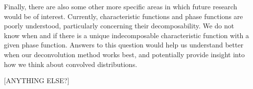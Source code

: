 Finally, there are also some other more specific areas in which future research would be of interest. Currently, characteristic functions and phase functions are poorly understood, particularly concerning their decomposability. 
We do not know when and if there is a unique indecomposable characteristic function with a given phase function. Answers to this question would help us understand better when our deconvolution method works best, and potentially provide insight into how we think about convolved distributions.


[ANYTHING ELSE?]